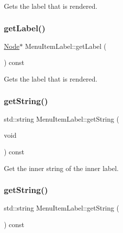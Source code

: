 Gets the label that is rendered. \mbox{\label{classMenuItemLabel_a4e54f5c99e05377f183c6b8f3aec1f55}} 
\subsubsection{\texorpdfstring{get\+Label()}{getLabel()}\hspace{0.1cm}{\footnotesize\ttfamily [2/2]}}
{\footnotesize\ttfamily \hyperlink{classNode}{Node}$\ast$ Menu\+Item\+Label\+::get\+Label (\begin{DoxyParamCaption}{ }\end{DoxyParamCaption}) const\hspace{0.3cm}{\ttfamily [inline]}}

Gets the label that is rendered. \mbox{\label{classMenuItemLabel_a8eb49b748631f0f68d85ab7e61eaa21d}} 
\subsubsection{\texorpdfstring{get\+String()}{getString()}\hspace{0.1cm}{\footnotesize\ttfamily [1/2]}}
{\footnotesize\ttfamily std\+::string Menu\+Item\+Label\+::get\+String (\begin{DoxyParamCaption}\item[{void}]{ }\end{DoxyParamCaption}) const}

Get the inner string of the inner label. \mbox{\label{classMenuItemLabel_a8eb49b748631f0f68d85ab7e61eaa21d}} 
\subsubsection{\texorpdfstring{get\+String()}{getString()}\hspace{0.1cm}{\footnotesize\ttfamily [2/2]}}
{\footnotesize\ttfamily std\+::string Menu\+Item\+Label\+::get\+String (\begin{DoxyParamCaption}{ }\end{DoxyParamCaption}) const}

